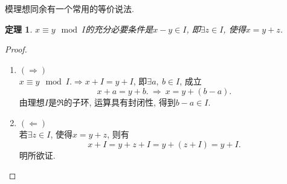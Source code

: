 \documentclass[UTF8, twoside]{ctexart}
\theoremstyle{nonumberplain}
\newtheorem{proof}{\heiti 证明}  %
\theoremstyle{nonumberplain}
\theoremstyle{plain}
\newtheorem{dingli4}[dingyi4]{定理}
\begin{document}
	模理想同余有一个常用的等价说法.
	\begin{dingli4}
		$x\equiv y\ \bmod I$的充分必要条件是$x-y\in I$, 即$\exists z\in I$, 使得$x=y+z$.
	\end{dingli4}
	\begin{proof}
		\phantom{哈哈}
		\begin{enumerate}
		\item $\left( \Rightarrow \right)$\\
		$x\equiv y\ \bmod I.\Rightarrow 
		x+I=y+I$, 即$\exists a,\ b\in I$, 成立
		\[
			x+a=y+b.\ \Longrightarrow \ x=y+\left( b-a \right).
		\]
		由理想$I$是$\Re $的子环, 运算具有封闭性, 得到$b-a\in I$. 
		
		\item $\left( \Leftarrow \right)$\\
		若$\exists z\in I$, 使得$x=y+z$, 则有
		\[
			x+I=y+z+I=y+\left( z+I \right)=y+I.
		\]
		明所欲证. 
		\end{enumerate}
	\end{proof}
	\vskip 0.5cm
	
\end{document}
